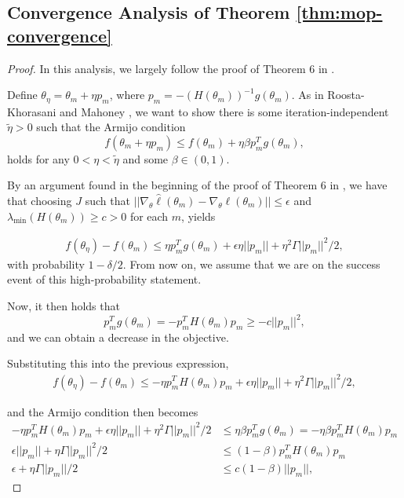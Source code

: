 \subsection{Convergence Analysis of Theorem \ref{thm:mop-convergence}}

\begin{proof}

In this analysis, we largely follow the proof of Theorem 6 in \cite{mahoney16}.

Define $\theta_\eta = \theta_m + \eta p_m$, where $p_m=-(H(\theta_m))^{-1}g(\theta_m)$. As in Roosta-Khorasani and Mahoney \cite{mahoney16}, we want to show there is some iteration-independent $\tilde{\eta}>0$ such that the Armijo condition
\begin{equation}
    f(\theta_m+\eta p_m) \leq f(\theta_m) + \eta\beta p_m^Tg(\theta_m),
\end{equation}
holds for any $0< \eta < \tilde{\eta}$ and some $\beta \in (0,1)$.

By an argument found in the beginning of the proof of Theorem 6 in \cite{mahoney16}, we have that choosing $J$ such that $||\nabla_\theta\hat{\ell}(\theta_m) - \nabla_\theta \ell(\theta_m)|| \leq \epsilon$ and $\lambda_{\min}(H(\theta_m)) \geq c>0$ for each $m$, yields

\begin{align}
    f(\theta_\eta)-f(\theta_m) \leq \eta p_m^Tg(\theta_m) + \epsilon\eta||p_m|| + \eta^2 \Gamma ||p_m||^2 / 2,
\end{align}
with probability $1-\delta/2$. From now on, we assume that we are on the success event of this high-probability statement. 

Now, it then holds that
\begin{equation}
    p_m^Tg(\theta_m) = -p_m^TH(\theta_m)p_m \geq -c||p_m||^2,
\end{equation}
and we can obtain a decrease in the objective. 

Substituting this into the previous expression,
\begin{align}
    f(\theta_\eta)-f(\theta_m) \leq -\eta p_m^TH(\theta_m)p_m + \epsilon\eta||p_m|| + \eta^2 \Gamma ||p_m||^2 / 2,
\end{align}

and the Armijo condition then becomes
\begin{align}
    -\eta p_m^TH(\theta_m)p_m + \epsilon\eta||p_m|| + \eta^2 \Gamma ||p_m||^2 / 2 &\leq \eta \beta p_m^Tg(\theta_m) = - \eta \beta p_m^TH(\theta_m)p_m \\
    \epsilon||p_m|| + \eta \Gamma ||p_m||^2 / 2 &\leq (1- \beta) p_m^TH(\theta_m)p_m \\
    \epsilon + \eta \Gamma ||p_m|| / 2 &\leq c(1- \beta) ||p_m||,
\end{align}


\end{proof}
